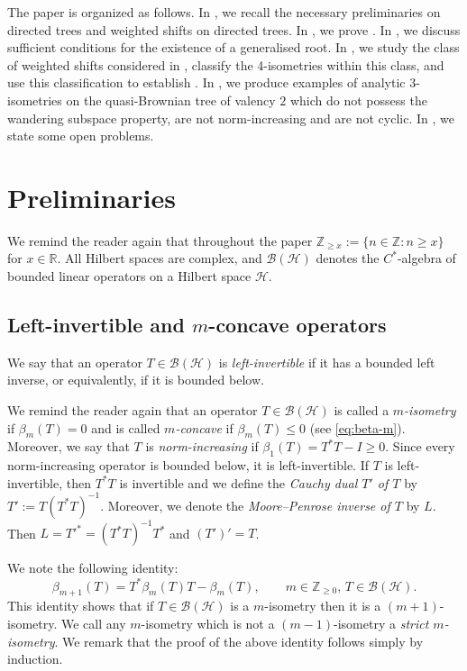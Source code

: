 \documentclass[11pt, reqno, a4paper]{amsart}
\theoremstyle{definition}
\newcommand{\calB}{{\mathcal{B}}}
\newcommand{\calH}{{\mathcal{H}}}
\renewcommand{\le}{\leqslant}
\renewcommand{\ge}{\geqslant}
\renewcommand{\geq}{\geqslant}
\newcommand{\Z}{\mathbb Z}
\numberwithin{equation}{section}
\begin{document}
    The paper is organized as follows. In , we recall the necessary preliminaries on directed trees and weighted shifts on directed trees. In , we prove . In , we discuss sufficient conditions for the existence of a generalised root. In , we study the class of weighted shifts considered in \cite{MR5052237}, classify the 4-isometries within this class, and use this classification to establish . In , we produce examples of analytic $3$-isometries on the quasi-Brownian tree of valency $2$ which do not possess the wandering subspace property, are not norm-increasing and are not cyclic. In , we state some open problems.


\section{Preliminaries}\label{sec:preliminaries}

We remind the reader again that throughout the paper $\mathbb Z_{\geq x}:=\{n\in\mathbb Z:n\geq x\}$ for $x\in\mathbb R$. All Hilbert spaces are complex, and $\mathcal B(\mathcal H)$ denotes the $C^*$-algebra of bounded linear operators on a Hilbert space $\mathcal H$.

\subsection{Left-invertible and \texorpdfstring{$m$}{m}-concave operators}  We say that an operator $T\in\calB(\calH)$ is \textit{left-invertible} if it has a bounded left inverse, or equivalently, if it is bounded below.

We remind the reader again that an operator $T\in \calB (\calH)$ is called a \textit{$m$-isometry} if $\beta_m (T) = 0$ and is called \textit{$m$-concave} if $\beta_m (T) \le 0$ (see \cref{eq:beta-m}). Moreover, we say that $T$ is \textit{norm-increasing} if $\beta_1(T)=T^*T-I\ge 0$. Since every norm-increasing operator is bounded below, it is left-invertible. If $T$ is left-invertible, then $T^* T$ is invertible and we define the \textit{Cauchy dual $T'$ of $T$} by $T' := T (T^* T)^{-1}$. Moreover, we denote the \textit{Moore--Penrose inverse of $T$} by $L$. Then $L= T'^{*} = (T^* T)^{-1}T^*$ and $(T')' = T$.

We note the following identity:
\begin{equation}
    \beta_{m+1} (T) = T^* \beta_m (T) T -\beta_m (T), \qquad m \in \Z_{\ge 0}, \,  T \in \calB (\calH).
    \label{eq:beta-m-recursion}
\end{equation}
This identity shows that if $T \in \calB (\calH)$ is a $m$-isometry then it is a $(m+1)$-isometry. We call any $m$-isometry which is not a $(m-1)$-isometry a \textit{strict $m$-isometry}. We remark that the proof of the above identity follows simply by induction. 
\end{document}
